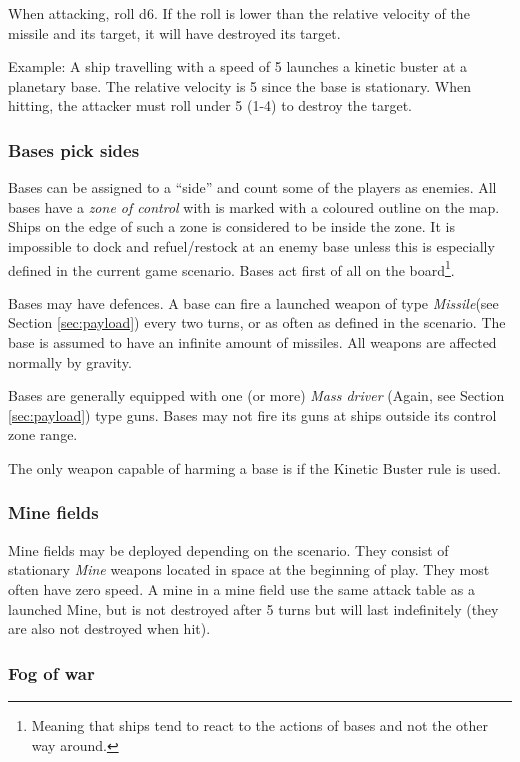 \documentclass[a4paper,12pt,notitlepage,twocolumn]{article}
\begin{document}
When attacking, roll d6. If the roll is lower than the relative velocity
of the missile and its target, it will have destroyed its target. 

Example: A ship travelling with a speed of 5 launches a kinetic buster
at a planetary base. The relative velocity is 5 since the base is 
stationary. When hitting, the attacker must roll under 5 (1-4) to destroy the
target. 


\subsubsection*{Bases pick sides}

Bases can be assigned to a ``side'' and count some of the players as
enemies. All bases have a \emph{zone of control} with is marked with a
coloured outline on the map. Ships on the edge of such a zone is
considered to be inside the zone. It is impossible to dock and
refuel/restock at an enemy base unless this is especially defined in
the current game scenario. Bases act first of all on the
board\footnote{Meaning that ships tend to react to the actions of bases and
  not the other way around.}. 

Bases may have defences. A base can fire
a launched weapon of type \emph{Missile}(see Section
\ref{sec:payload}) every two turns, or as often as defined in the
scenario. The base is assumed to have an infinite amount of missiles. 
All weapons are affected normally by gravity. 

Bases are generally equipped with one (or more) \emph{Mass driver}
(Again, see Section \ref{sec:payload})
type guns. Bases may not fire its guns at ships outside its control
zone range.  

The only weapon capable of harming a base is if the Kinetic Buster rule
is used. 

\subsubsection*{Mine fields}

Mine fields may be deployed depending on the scenario. They consist
of stationary \emph{Mine} weapons located in space at the
beginning of play. They most often have zero speed. A mine in a mine
field use the same attack table as a launched Mine, but is not
destroyed after 5 turns but will last indefinitely (they are also 
not destroyed when hit).

\subsubsection*{Fog of war}
\end{document}
